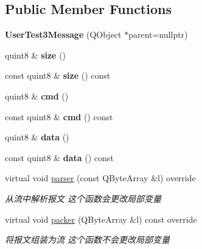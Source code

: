 \subsection*{Public Member Functions}
\begin{DoxyCompactItemize}
\item 
\mbox{\label{class_user_test3_message_a096319d6c9d230cdc433516417620e9e}} 
{\bfseries User\+Test3\+Message} (Q\+Object $\ast$parent=nullptr)
\item 
\mbox{\label{class_user_test3_message_a4c626acc7fbf208d8b825f4125f3c2f6}} 
quint8 \& {\bfseries size} ()
\item 
\mbox{\label{class_user_test3_message_aa306a28122d208b290421e7778e8d2d2}} 
const quint8 \& {\bfseries size} () const
\item 
\mbox{\label{class_user_test3_message_ac359e13b222d10dbbbda3e96bc24af04}} 
quint8 \& {\bfseries cmd} ()
\item 
\mbox{\label{class_user_test3_message_a1bc2765e3e1825aabc78739dd132f969}} 
const quint8 \& {\bfseries cmd} () const
\item 
\mbox{\label{class_user_test3_message_a8e91296b193736b8723a0ac99f51efa7}} 
quint8 \& {\bfseries data} ()
\item 
\mbox{\label{class_user_test3_message_a6dda73904e33ba25409b3c012a824875}} 
const quint8 \& {\bfseries data} () const
\item 
virtual void \mbox{\hyperlink{class_user_test3_message_a5d53280632233833c6e151a86a5add32}{parser}} (const Q\+Byte\+Array \&l) override
\begin{DoxyCompactList}\small\item\em 从流中解析报文 这个函数会更改局部变量 \end{DoxyCompactList}\item 
virtual void \mbox{\hyperlink{class_user_test3_message_a7c62be854d25bcab0f2c0d95d6f92c93}{packer}} (Q\+Byte\+Array \&l) const override
\begin{DoxyCompactList}\small\item\em 将报文组装为流 这个函数不会更改局部变量 \end{DoxyCompactList}\end{DoxyCompactItemize}


